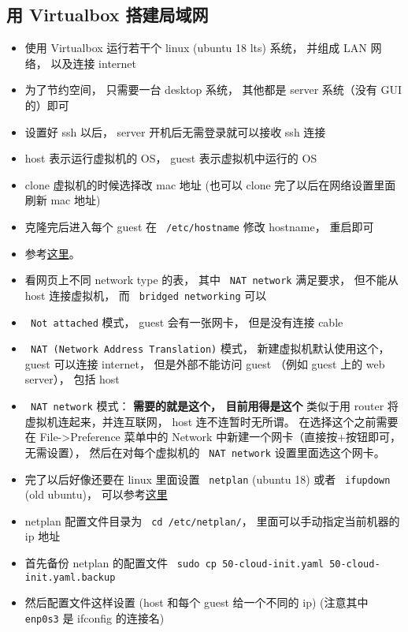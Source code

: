 \subsection{用 Virtualbox 搭建局域网}\label{VirBox_sub1}

\begin{itemize}
\item 使用 Virtualbox 运行若干个 linux (ubuntu 18 lts) 系统， 并组成 LAN 网络， 以及连接 internet
\item 为了节约空间， 只需要一台 desktop 系统， 其他都是 server 系统（没有 GUI 的）即可
\item 设置好 ssh 以后， server 开机后无需登录就可以接收 ssh 连接
\item host 表示运行虚拟机的 OS， guest 表示虚拟机中运行的 OS
\item clone 虚拟机的时候选择改 mac 地址 (也可以 clone 完了以后在网络设置里面刷新 mac 地址)
\item 克隆完后进入每个 guest 在 \verb` /etc/hostname` 修改 hostname， 重启即可
\item 参考\href{https://www.thomas-krenn.com/en/wiki/Network_Configuration_in_VirtualBox}{这里}。
\item 看网页上不同 network type 的表， 其中 \verb` NAT network` 满足要求， 但不能从 host 连接虚拟机， 而 \verb` bridged networking` 可以
\item \verb` Not attached` 模式， guest 会有一张网卡， 但是没有连接 cable
\item \verb` NAT (Network Address Translation)` 模式， 新建虚拟机默认使用这个， guest 可以连接 internet， 但是外部不能访问 guest （例如 guest 上的 web server）， 包括 host
\item \verb` NAT network` 模式： \textbf{需要的就是这个， 目前用得是这个} 类似于用 router 将虚拟机连起来，并连互联网， host 连不连暂时无所谓。 在选择这个之前需要在 File->Preference 菜单中的 Network 中新建一个网卡（直接按+按钮即可，无需设置）， 然后在对每个虚拟机的 \verb` NAT network` 设置里面选这个网卡。
\item 完了以后好像还要在 linux 里面设置 \verb` netplan` (ubuntu 18) 或者 \verb` ifupdown` (old ubuntu)， 可以参考\href{https://www.linux.com/tutorials/how-use-netplan-network-configuration-tool-linux/}{这里}
\item netplan 配置文件目录为 \verb` cd /etc/netplan/`， 里面可以手动指定当前机器的 ip 地址
\item 首先备份 netplan 的配置文件 \verb` sudo cp 50-cloud-init.yaml 50-cloud-init.yaml.backup`
\item 然后配置文件这样设置 (host 和每个 guest 给一个不同的 ip) (注意其中 \verb` enp0s3` 是 ifconfig 的连接名)

\end{itemize}
